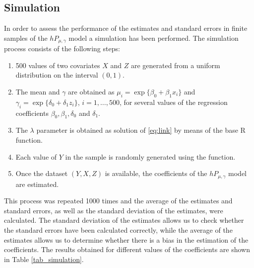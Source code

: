 \subsection{Simulation}

In order to assess the performance of the estimates and standard errors in finite samples of the $hP_{\mu, \gamma}$ model a simulation has been performed. The simulation process consists of the following steps:
 \begin{enumerate}
    \item 500 values of two covariates $X$ and $Z$ are generated from a uniform distribution on the interval $(0,1)$.
    \item The mean and $ \gamma $ are obtained as $\mu_i = \exp\{ \beta_0 + \beta_1 x_{i} \}$ and $\gamma_i = \exp\{ \delta_0 + \delta_1 z_{i} \}$, $i=1,\dots,500$, for several values of the regression coefficients $\beta_0,\beta_1,\delta_0$ and $\delta_1$.
    \item The $\lambda$ parameter is obtained as solution of \eqref{eq:link} by means of the base R  function.
    \item Each value of $Y$ in the sample is randomly generated using the  function.
    \item Once the dataset $(Y, X, Z)$ is available, the coefficients of the $hP_{\mu, \gamma}$ model are estimated.
 \end{enumerate}

This process was repeated 1000 times and the average of the estimates and standard errors, as well as the standard deviation of the estimates, were calculated. The standard deviation of the estimates allows us to check whether the standard errors have been calculated correctly, while the average of the estimates allows us to determine whether there is a bias in the estimation of the coefficients. The results obtained for different values of the coefficients are shown in Table \ref{tab_simulation}.

